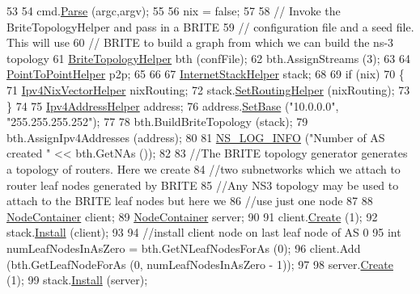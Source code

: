 \begin{DoxyCode}
53 
54   cmd.\hyperlink{classns3_1_1CommandLine_a5c10b85b3207e5ecb48d907966923156}{Parse} (argc,argv);
55 
56   nix = \textcolor{keyword}{false};
57 
58   \textcolor{comment}{// Invoke the BriteTopologyHelper and pass in a BRITE}
59   \textcolor{comment}{// configuration file and a seed file. This will use}
60   \textcolor{comment}{// BRITE to build a graph from which we can build the ns-3 topology}
61   \hyperlink{classns3_1_1BriteTopologyHelper}{BriteTopologyHelper} bth (confFile);
62   bth.AssignStreams (3);
63 
64   \hyperlink{classns3_1_1PointToPointHelper}{PointToPointHelper} p2p;
65 
66 
67   \hyperlink{classns3_1_1InternetStackHelper}{InternetStackHelper} stack;
68 
69   \textcolor{keywordflow}{if} (nix)
70     \{
71       \hyperlink{classns3_1_1Ipv4NixVectorHelper}{Ipv4NixVectorHelper} nixRouting;
72       stack.\hyperlink{classns3_1_1InternetStackHelper_a3e382c02df022dec79952a7eca8cd5ba}{SetRoutingHelper} (nixRouting);
73     \}
74 
75   \hyperlink{classns3_1_1Ipv4AddressHelper}{Ipv4AddressHelper} address;
76   address.\hyperlink{classns3_1_1Ipv4AddressHelper_acf7b16dd25bac67e00f5e25f90a9a035}{SetBase} (\textcolor{stringliteral}{"10.0.0.0"}, \textcolor{stringliteral}{"255.255.255.252"});
77 
78   bth.BuildBriteTopology (stack);
79   bth.AssignIpv4Addresses (address);
80 
81   \hyperlink{group__logging_gafbd73ee2cf9f26b319f49086d8e860fb}{NS\_LOG\_INFO} (\textcolor{stringliteral}{"Number of AS created "} << bth.GetNAs ());
82 
83   \textcolor{comment}{//The BRITE topology generator generates a topology of routers.  Here we create}
84   \textcolor{comment}{//two subnetworks which we attach to router leaf nodes generated by BRITE}
85   \textcolor{comment}{//Any NS3 topology may be used to attach to the BRITE leaf nodes but here we}
86   \textcolor{comment}{//use just one node}
87 
88   \hyperlink{classns3_1_1NodeContainer}{NodeContainer} client;
89   \hyperlink{classns3_1_1NodeContainer}{NodeContainer} server;
90 
91   client.\hyperlink{classns3_1_1NodeContainer_a787f059e2813e8b951cc6914d11dfe69}{Create} (1);
92   stack.\hyperlink{classns3_1_1InternetStackHelper_a6645b412f31283d2d9bc3d8a95cebbc0}{Install} (client);
93 
94   \textcolor{comment}{//install client node on last leaf node of AS 0}
95   \textcolor{keywordtype}{int} numLeafNodesInAsZero = bth.GetNLeafNodesForAs (0);
96   client.Add (bth.GetLeafNodeForAs (0, numLeafNodesInAsZero - 1));
97 
98   server.\hyperlink{classns3_1_1NodeContainer_a787f059e2813e8b951cc6914d11dfe69}{Create} (1);
99   stack.\hyperlink{classns3_1_1InternetStackHelper_a6645b412f31283d2d9bc3d8a95cebbc0}{Install} (server);

\end{DoxyCode}
